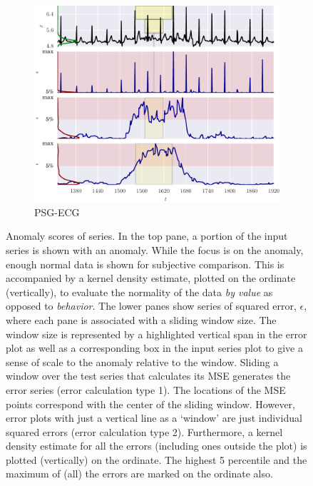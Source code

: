  \nopagebreak


\begin{figure}[H] 
    \ContinuedFloat

    \begin{subfigure}[t]{\textwidth} 
        \centering
        \includegraphics[]{figs/er_sleep.pdf}
        \caption{PSG-ECG}
    \end{subfigure}%

\caption[Anomaly scores of series]{Anomaly scores of series.
%
In the top pane, a portion of the input series is shown with an anomaly.
%
While the focus is on the anomaly, enough normal data is shown for subjective comparison.
%
This is accompanied by a kernel density estimate, plotted on the ordinate (vertically), to evaluate the normality of the data \emph{by value} as opposed to \emph{behavior}.
%
The lower panes show series of squared error, $\epsilon$, where each pane is associated with a sliding window size.
%
The window size is represented by a highlighted vertical span in the error plot as well as a corresponding box in the input series plot to give a sense of scale to the anomaly relative to the window.
%
Sliding a window over the test series that calculates its MSE generates the error series (error calculation type 1).
%
The locations of the MSE points correspond with the center of the sliding window.
%
However, error plots with just a vertical line as a `window' are just individual squared errors (error calculation type 2).
%
Furthermore, a kernel density estimate for all the errors (including ones outside the plot) is plotted (vertically) on the ordinate.
%
The highest 5 percentile and the maximum of (all) the errors are marked on the ordinate also.
}
\label{fig:err}
\end{figure}


